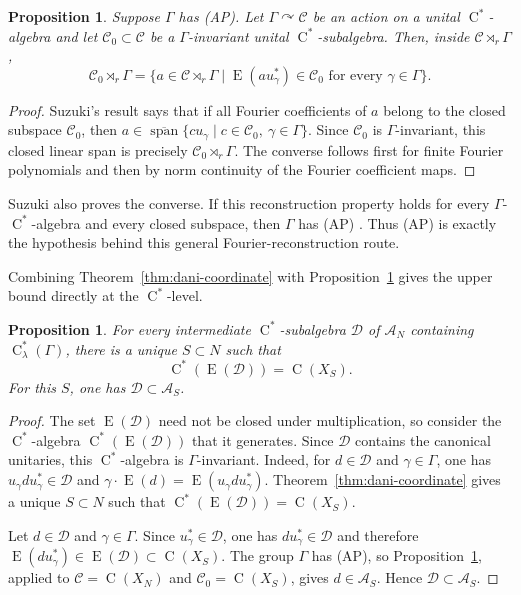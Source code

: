 \documentclass[11pt]{amsart}
\numberwithin{equation}{section}
\newcommand{\rC}{\operatorname{C}}
\newcommand{\rE}{\operatorname{E}}
\newtheorem{proposition}[theorem]{Proposition}
\theoremstyle{definition}
\begin{document}
	\begin{proposition}
		\label{prop:suzuki}
		Suppose $\Gamma$ has {\rm(AP)}.  Let $\Gamma\curvearrowright\mathcal C$ be an
		action on a unital $\rC^*$-algebra and let
		$\mathcal C_0\subset\mathcal C$ be a $\Gamma$-invariant unital
		$\rC^*$-subalgebra.  Then, inside $\mathcal C\rtimes_r\Gamma$,
		\[
		\mathcal C_0\rtimes_r\Gamma
		=
		\{a\in\mathcal C\rtimes_r\Gamma\mid
		\rE(au_\gamma^*)\in\mathcal C_0
		\text{ for every }\gamma\in\Gamma\}.
		\]
	\end{proposition}
	
	\begin{proof}
		Suzuki's result says that if all Fourier coefficients of $a$ belong to the
		closed subspace $\mathcal C_0$, then
		$a\in\overline{\operatorname{span}}\{cu_\gamma\mid c\in\mathcal C_0,
		\ \gamma\in\Gamma\}$.
		Since $\mathcal C_0$ is $\Gamma$-invariant, this closed linear span is precisely
		$\mathcal C_0\rtimes_r\Gamma$.  The converse follows first for finite Fourier
		polynomials and then by norm continuity of the Fourier coefficient maps.
	\end{proof}

	Suzuki also proves the converse. If this reconstruction property holds for every
	$\Gamma$-$\rC^*$-algebra and every closed subspace, then $\Gamma$ has {\rm(AP)}
	\cite[Proposition~3.4]{Su17}. Thus {\rm(AP)} is exactly the hypothesis behind this
	general Fourier-reconstruction route.
	
	Combining Theorem~\ref{thm:dani-coordinate} with
	Proposition~\ref{prop:suzuki} gives the upper bound directly at the
	$\rC^*$-level.
	
	\begin{proposition}
		\label{prop:dani-ap-upper}
		For every intermediate $\rC^*$-subalgebra $\mathcal D$ of $\mathcal A_N$
		containing $\rC^*_{\lambda}(\Gamma)$, there is a unique $S\subset N$ such that
		\[
		\rC^*(\rE(\mathcal D))=\rC(X_S).
		\]
		For this $S$, one has $\mathcal D\subset\mathcal A_S$.
	\end{proposition}
	
	\begin{proof}
		The set $\rE(\mathcal D)$ need not be closed under multiplication, so consider
		the $\rC^*$-algebra $\rC^*(\rE(\mathcal D))$ that it generates. Since
		$\mathcal D$ contains the canonical unitaries, this $\rC^*$-algebra is
		$\Gamma$-invariant. Indeed, for $d\in\mathcal D$ and
		$\gamma\in\Gamma$, one has $u_\gamma d u_\gamma^*\in\mathcal D$ and
		$\gamma\cdot\rE(d)=\rE(u_\gamma d u_\gamma^*)$.
		Theorem~\ref{thm:dani-coordinate} gives a unique $S\subset N$ such that
		$\rC^*(\rE(\mathcal D))=\rC(X_S)$.
		
		Let $d\in\mathcal D$ and $\gamma\in\Gamma$. Since $u_\gamma^*\in\mathcal D$,
		one has $du_\gamma^*\in\mathcal D$ and therefore
		$\rE(du_\gamma^*)\in\rE(\mathcal D)\subset\rC(X_S)$.
		The group $\Gamma$ has {\rm(AP)}, so Proposition~\ref{prop:suzuki}, applied to
		$\mathcal C=\rC(X_N)$ and $\mathcal C_0=\rC(X_S)$, gives
		$d\in\mathcal A_S$.  Hence $\mathcal D\subset\mathcal A_S$.
	\end{proof}
	
\end{document}
